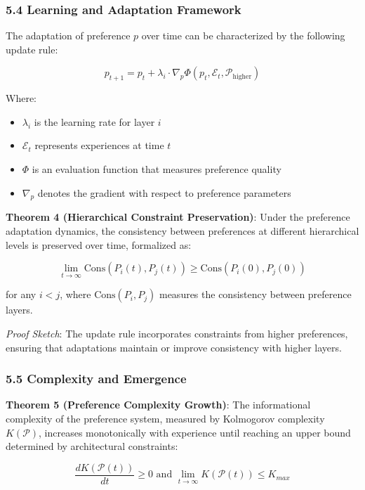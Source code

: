 \documentclass[
]{article}
\providecommand{\tightlist}{%
  \setlength{\itemsep}{0pt}\setlength{\parskip}{0pt}}
\begin{document}
\subsubsection{5.4 Learning and Adaptation
Framework}\label{learning-and-adaptation-framework}

The adaptation of preference \(p\) over time can be characterized by the
following update rule:

\[p_{t+1} = p_t + \lambda_i \cdot \nabla_p \Phi(p_t, \mathcal{E}_t, \mathcal{P}_{\text{higher}})\]

Where:

\begin{itemize}
\tightlist
\item
  \(\lambda_i\) is the learning rate for layer \(i\)
\item
  \(\mathcal{E}_t\) represents experiences at time \(t\)
\item
  \(\Phi\) is an evaluation function that measures preference quality
\item
  \(\nabla_p\) denotes the gradient with respect to preference
  parameters
\end{itemize}

\textbf{Theorem 4 (Hierarchical Constraint Preservation)}: Under the
preference adaptation dynamics, the consistency between preferences at
different hierarchical levels is preserved over time, formalized as:

\[\lim_{t \rightarrow \infty} \text{Cons}(P_i(t), P_j(t)) \geq \text{Cons}(P_i(0), P_j(0))\]

for any \(i < j\), where \(\text{Cons}(P_i, P_j)\) measures the
consistency between preference layers.

\emph{Proof Sketch}: The update rule incorporates constraints from
higher preferences, ensuring that adaptations maintain or improve
consistency with higher layers.

\subsubsection{5.5 Complexity and
Emergence}\label{complexity-and-emergence}

\textbf{Theorem 5 (Preference Complexity Growth)}: The informational
complexity of the preference system, measured by Kolmogorov complexity
\(K(\mathcal{P})\), increases monotonically with experience until
reaching an upper bound determined by architectural constraints:

\[\frac{dK(\mathcal{P}(t))}{dt} \geq 0 \text{ and } \lim_{t \rightarrow \infty} K(\mathcal{P}(t)) \leq K_{max}\]
\end{document}
